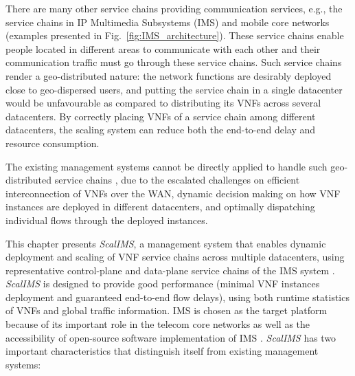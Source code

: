  There are many other service chains providing communication services, e.g., the service chains in IP Multimedia Subsystems (IMS) \cite{3gpp-ims} and mobile core networks~\cite{epc} (examples presented in Fig.~\ref{fig:IMS_architecture}). These service chains enable people located in different areas to communicate with each other and their communication traffic must go through these service chains. Such service chains render a geo-distributed nature: the network functions are desirably deployed close to geo-dispersed users, and putting the service chain in a single datacenter would be unfavourable as compared to distributing its VNFs across several datacenters. By correctly placing VNFs of a service chain among different datacenters, the scaling system can reduce both the end-to-end delay and resource consumption.


 The existing management systems cannot be directly applied to handle such geo-distributed service chains \cite{qazi2016klein}, due to the escalated challenges on efficient interconnection of VNFs over the WAN, dynamic decision making on how VNF instances are deployed in different datacenters, and optimally dispatching individual flows through the deployed instances.




This chapter presents \textit{ScalIMS}, a management system that enables dynamic deployment and scaling of VNF service chains across multiple datacenters, using representative control-plane and data-plane service chains of the IMS system \cite{3gpp-ims}. \textit{ScalIMS} is designed to provide good performance (minimal VNF instances deployment and guaranteed end-to-end flow delays), using both runtime statistics of VNFs and global traffic information. IMS is chosen as the target platform because of its important role in the telecom core networks as well as the accessibility of open-source software implementation of IMS \cite{project-clearwater}. \textit{ScalIMS} has two important characteristics that distinguish itself from existing management systems:


